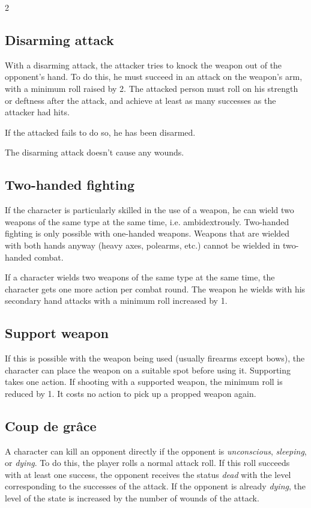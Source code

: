 \begin{multicols}{2}
\subsection{Disarming attack}

With a disarming attack, the attacker tries to knock the weapon out of the opponent's hand. To do this, he must succeed in an attack on the weapon's arm, with a minimum roll raised by 2. The attacked person must roll on his strength or deftness after the attack, and achieve at least as many successes as the attacker had hits.

If the attacked fails to do so, he has been disarmed.

The disarming attack doesn't cause any wounds.

\subsection{Two-handed fighting}

If the character is particularly skilled in the use of a weapon, he can wield two weapons of the same type at the same time, i.e. ambidextrously. Two-handed fighting is only possible with one-handed weapons. Weapons that are wielded with both hands anyway (heavy axes, polearms, etc.) cannot be wielded in two-handed combat.

If a character wields two weapons of the same type at the same time, the character gets one more action per combat round. The weapon he wields with his secondary hand attacks with a minimum roll increased by 1.

\subsection{Support weapon}

If this is possible with the weapon being used (usually firearms except bows), the character can place the weapon on a suitable spot before using it. Supporting takes one action. If shooting with a supported weapon, the minimum roll is reduced by 1. It costs no action to pick up a propped weapon again.

\subsection{Coup de grâce}

A character can kill an opponent directly if the opponent is \textit{unconscious}, \textit{sleeping}, or \textit{dying}. To do this, the player rolls a normal attack roll. If this roll succeeds with at least one success, the opponent receives the status \textit{dead} with the level corresponding to the successes of the attack. If the opponent is already \textit{dying}, the level of the state is increased by the number of wounds of the attack.


\end{multicols}
